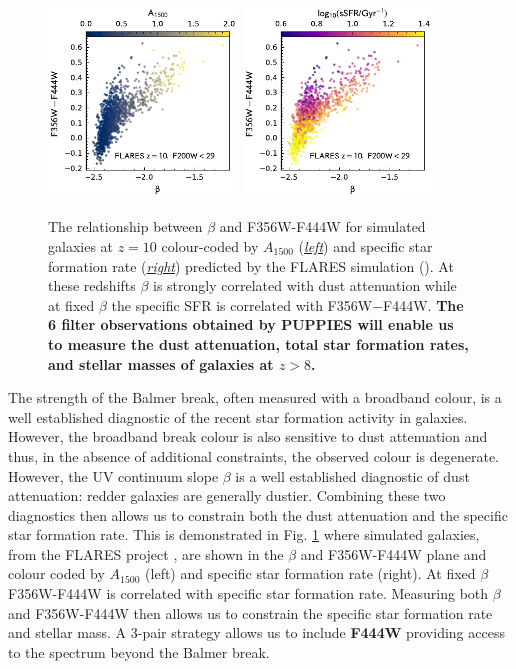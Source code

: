 \documentclass[12pt]{article}
\begin{document}
\begin{figure}[h!]
    \centering
    \includegraphics[width=0.45\textwidth]{figs/beta_A1500.pdf}
    \includegraphics[width=0.45\textwidth]{figs/beta_sSFR.pdf}
    \caption{The relationship between $\beta$ and F356W-F444W for simulated galaxies at $z=10$ colour-coded by $A_{1500}$ (\emph{\underline{left}}) and specific star formation rate (\emph{\underline{right}}) predicted by the FLARES simulation (\citealt{2020MNRAS.tmp.3168L, Vijayan2020}). At these redshifts $\beta$ is strongly correlated with dust attenuation while at fixed $\beta$ the specific SFR is correlated with F356W$-$F444W. \textbf{The 6 filter observations obtained by PUPPIES will enable us to measure the dust attenuation, total star formation rates, and stellar masses of galaxies at $z>8$.}}
    \label{fig:beta}
\end{figure}

The strength of the Balmer break, often measured with a broadband colour, is a well established diagnostic of the recent star formation activity in galaxies. However, the broadband break colour is also sensitive to dust attenuation and thus, in the absence of additional constraints, the observed colour is degenerate. However, the UV continuum slope $\beta$ is a well established diagnostic of dust attenuation: redder galaxies are generally dustier. Combining these two diagnostics then allows us to constrain both the dust attenuation and the specific star formation rate. This is demonstrated in  Fig. \ref{fig:beta} where simulated galaxies, from the FLARES project \citep{2020MNRAS.tmp.3168L}, are shown in the $\beta$ and F356W-F444W plane and colour coded by $A_{1500}$ (left) and specific star formation rate (right). At fixed $\beta$ F356W-F444W is correlated with specific star formation rate. Measuring both $\beta$ and F356W-F444W then allows us to constrain the specific star formation rate and stellar mass. A 3-pair strategy allows us to include {\bf F444W} providing access to the spectrum beyond the Balmer break.
\end{document}
